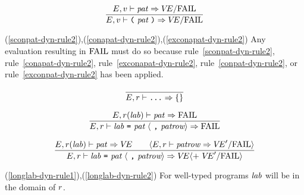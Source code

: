 \begin{equation}	%
\frac{\E,\V\ts\pat\ra\VE/\fail}
     {\E,\V\ts\parpat\ra\VE/\fail}\index{56.1}
\end{equation}

\comments
\begin{description}
\item{(\ref{sconpat-dyn-rule2}),(\ref{conapat-dyn-rule2}),(\ref{exconapat-dyn-rule2})}
  Any evaluation resulting in ${\rm FAIL}$ must do so because 
rule~\ref{sconpat-dyn-rule2},
rule~\ref{conapat-dyn-rule2},
rule~\ref{exconapat-dyn-rule2},
rule~\ref{conpat-dyn-rule2},
or rule~\ref{exconpat-dyn-rule2} has been
applied.
\end{description}

\begin{equation}	%
\frac{}
     {\E,\r\ts\wildrec\ra\emptymap}\index{56.2}
\end{equation}
 

\begin{equation}	%
\label{longlab-dyn-rule1}
\frac{\E,\r(\lab)\ts\pat\ra\FAIL}
     {\E,\r\ts\longlabpats\ra\FAIL}
\end{equation}

\begin{equation}	%
\label{longlab-dyn-rule2}
\frac{\E,\r(\lab)\ts\pat\ra\VE\qquad
      \langle\E,\r\ts\labpats\ra\VE'/\fail\rangle }
     {\E,\r\ts\longlabpats\ra
      \VE\langle +\ \VE'/\fail\rangle}
\end{equation}
\comments
\begin{description}
\item{(\ref{longlab-dyn-rule1}),(\ref{longlab-dyn-rule2})}
For well-typed programs ${\it lab}$ will be in the domain of $r$.
\end{description}

